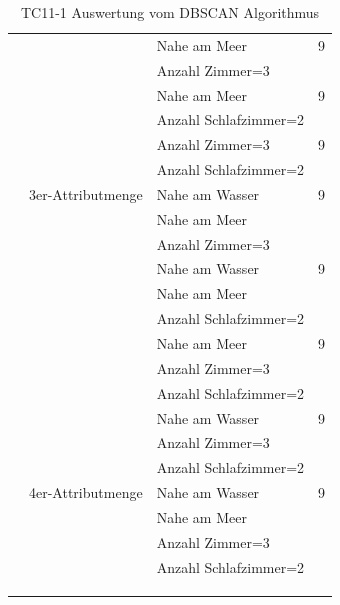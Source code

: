 \begin{longtable}{ | l | l | l | l |}
	& & \tabitem Nahe am Meer & 9 \\
	& & \tabitem Anzahl Zimmer=3 & \\ \cline{3-4} 
	& & \tabitem Nahe am Meer & 9 \\
	& & \tabitem Anzahl Schlafzimmer=2 & \\ \cline{3-4} 
	
	& & \tabitem Anzahl Zimmer=3 & 9 \\
	& & \tabitem Anzahl Schlafzimmer=2 & \\ \cline{2-4} 
	
	& 3er-Attributmenge & \tabitem Nahe am Wasser & 9 \\
	& & \tabitem Nahe am Meer & \\ 
	& & \tabitem Anzahl Zimmer=3 & \\ \cline{3-4} 
	& & \tabitem Nahe am Wasser & 9 \\
	& & \tabitem Nahe am Meer & \\ 
	& & \tabitem Anzahl Schlafzimmer=2 & \\ \cline{3-4}
	& & \tabitem Nahe am Meer & 9 \\
	& & \tabitem Anzahl Zimmer=3 & \\ 
	& & \tabitem Anzahl Schlafzimmer=2 & \\ \cline{3-4}
	& & \tabitem Nahe am Wasser & 9 \\
	& & \tabitem Anzahl Zimmer=3 & \\ 
	& & \tabitem Anzahl Schlafzimmer=2 & \\ \cline{2-4}
	
	& 4er-Attributmenge & \tabitem Nahe am Wasser & 9 \\
	& & \tabitem Nahe am Meer & \\ 
	& & \tabitem Anzahl Zimmer=3 & \\ 
	& & \tabitem Anzahl Schlafzimmer=2 & \\ \hline
	
	\rowcolor{tableheadcolor}
	\multicolumn{4}{|l|}{\bfseries Testergebnis} \\ \hline 
	\multicolumn{4}{|l|}{\cellcolor{green!25}} \\ \hline 
	
	\caption{TC11-1 Auswertung vom DBSCAN Algorithmus}
	\centering
	\label{fig:testingfazit:testing:testcases:11:1}
\end{longtable}
